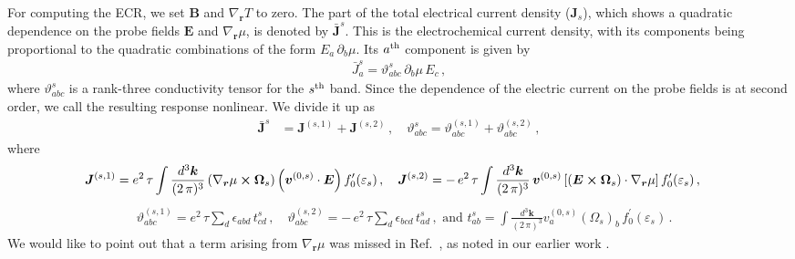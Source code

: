\documentclass[aps,prb,onecolumn,nofootinbib,citeautoscript,10pt]{revtex4-2}
\newcommand{\bs}[1]{\boldsymbol{#1}}
\begin{document}
For computing the ECR, we set $\bs B $ and $\nabla_{\bs r} T $ to zero. The part of the total electrical current density ($ {\bs J}_s $), which shows a quadratic dependence on the probe fields $\bs E$ and $\nabla_{\bs r} \mu $, is denoted by ${\bar {\bs J}}^s $. This is the electrochemical current density, with its components being proportional to the quadratic combinations of the form $ E_a  \, \partial_{b} \mu $. Its $a^{\rm th}$ component is given by
\begin{align}
\label{eqelectrocur}
{\bar J}^s_{a}   = \vartheta^s_{a  b c} \, \partial_b\mu \, E_c  \,,
\end{align}
where $\vartheta^s_{a b c }$ is a rank-three conductivity tensor for the $s^{\rm th}$ band. Since the dependence of the electric current on the probe fields is at second order, we call the resulting response nonlinear.
We divide it up as
\begin{align}
{\bar {\bs J}}^s  &  
 =  \bs{J}^{(s, 1)}   + \bs{J}^{(s, 2)}   \,,
 \quad \vartheta_{a  b c}^{s} = 
\vartheta_{a  b c}^{(s,1)} + \vartheta_{a  b c}^{(s,2)} \,,
\label{eqsecorderf} 
\end{align}
where
\begin{align}
\bs{J}^{(s, 1)} &=  e^2 \,\tau 
\int \frac{ d^3 \bs k}{(2\, \pi)^3 }  
\left( 
\nabla_{\bs r} \mu \cross \bs{\Omega}_{s}    \right ) 
\left(  {\boldsymbol v}^{(0,s)} \cdot \bs{E}   \right )
f^\prime_{0} ( \varepsilon_s) \,, \quad
\bs{J}^{(s, 2)}  = -\, e^2 \, \tau
\int \frac{ d^3 \bs k}{(2\, \pi)^3 }  
\, {\boldsymbol v}^{(0,s)}  \left[ 
\left( \bs{E} \cross \bs{\Omega}_s \right ) \cdot  
{\nabla}_{\bs r} \mu   \right]    f^\prime_0 (\varepsilon_s) \,,
\end{align}
\begin{align}
\label{eqtheta}
& \vartheta_{a  b c}^{(s,1)} =  e^{2} \,\tau
\sum_{d}  \epsilon_{a b d }\, t^s_{cd} \,, 
\quad \vartheta_{a  b c}^{(s,2)}  = - \,
e^2 \, \tau \sum_{d}  \epsilon_{b c d}\, t^s_{ad} \,,  \text{ and }
t^s_{ab} = \int \frac {d^3 \bs{k}} {(2 \, \pi)^3 } 
v^{(0,s)}_a \left( \Omega_s \right)_b \, f^{\prime}_0 (\varepsilon_s)   \,.
\end{align}
We would like to point out that a term arising from ${\nabla}_{\bs r} \mu$ was missed in Ref.~\cite{flores}, as noted in our earlier work \cite{ips-shreya}.
\end{document}
